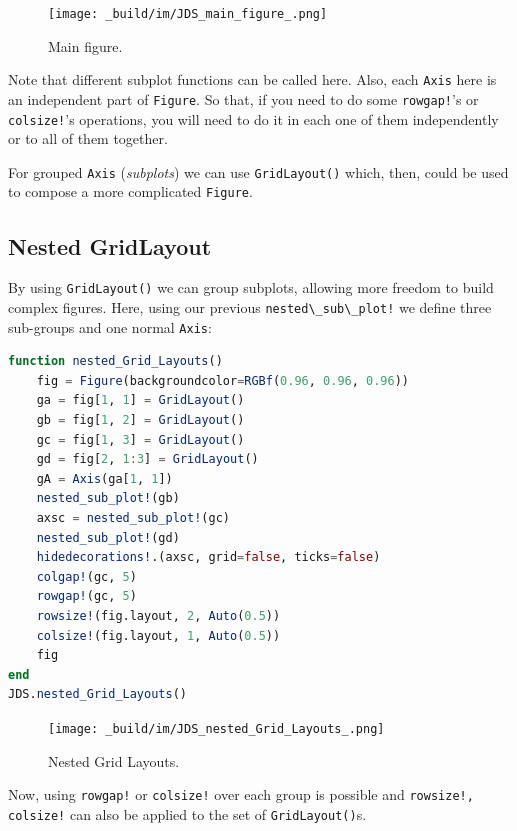 \documentclass[
  notoc %
]{tufte-book}
\newcommand{\passthrough}[1]{#1}
\begin{document}
\begin{figure}
\hypertarget{fig:main_figure}{%
\centering
\texttt{[image: \_build/im/JDS\_main\_figure\_.png]}
\caption{Main figure.}\label{fig:main_figure}
}
\end{figure}

Note that different subplot functions can be called here. Also, each
\passthrough{\lstinline!Axis!} here is an independent part of
\passthrough{\lstinline!Figure!}. So that, if you need to do some
\passthrough{\lstinline"rowgap!"}'s or
\passthrough{\lstinline"colsize!"}'s operations, you will need to do it
in each one of them independently or to all of them together.

For grouped \passthrough{\lstinline!Axis!} (\emph{subplots}) we can use
\passthrough{\lstinline!GridLayout()!} which, then, could be used to
compose a more complicated \passthrough{\lstinline!Figure!}.

\hypertarget{nested-gridlayout}{%
\subsection{Nested GridLayout}\label{nested-gridlayout}}

By using \passthrough{\lstinline!GridLayout()!} we can group subplots,
allowing more freedom to build complex figures. Here, using our previous
\passthrough{\lstinline"nested\_sub\_plot!"} we define three sub-groups
and one normal \passthrough{\lstinline!Axis!}:

\begin{lstlisting}[language=Julia]
function nested_Grid_Layouts()
    fig = Figure(backgroundcolor=RGBf(0.96, 0.96, 0.96))
    ga = fig[1, 1] = GridLayout()
    gb = fig[1, 2] = GridLayout()
    gc = fig[1, 3] = GridLayout()
    gd = fig[2, 1:3] = GridLayout()
    gA = Axis(ga[1, 1])
    nested_sub_plot!(gb)
    axsc = nested_sub_plot!(gc)
    nested_sub_plot!(gd)
    hidedecorations!.(axsc, grid=false, ticks=false)
    colgap!(gc, 5)
    rowgap!(gc, 5)
    rowsize!(fig.layout, 2, Auto(0.5))
    colsize!(fig.layout, 1, Auto(0.5))
    fig
end
JDS.nested_Grid_Layouts()
\end{lstlisting}

\begin{figure}
\hypertarget{fig:nested_Grid_Layouts}{%
\centering
\texttt{[image: \_build/im/JDS\_nested\_Grid\_Layouts\_.png]}
\caption{Nested Grid Layouts.}\label{fig:nested_Grid_Layouts}
}
\end{figure}

Now, using \passthrough{\lstinline"rowgap!"} or
\passthrough{\lstinline"colsize!"} over each group is possible and
\passthrough{\lstinline"rowsize!, colsize!"} can also be applied to the
set of \passthrough{\lstinline!GridLayout()!}s.
\end{document}
